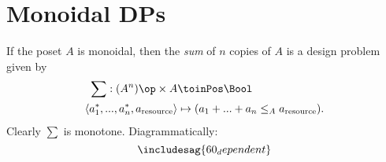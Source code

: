 \section{Monoidal DPs}



\begin{definition}
If the poset $A$ is monoidal, then the \emph{sum} of $n$ copies of $A$ is a design problem given by
\begin{align*}
\sum : (A^n)\op \times A &\toinPos \Bool \\
\langle a_1^*, ..., a_n^*, a_\text{resource} \rangle &\mapsto (a_1 + ... + a_n \leq_A a_\text{resource}).
\end{align*}
Clearly $\sum$ is monotone. Diagrammatically:
\[
\includesag{60_dependent}
\]
\end{definition}

